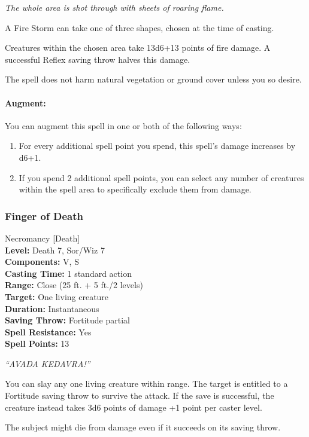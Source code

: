 \emph{The whole area is shot through with sheets of roaring flame.} 

A Fire Storm can take one of three shapes, chosen at the time of casting.

Creatures within the chosen area take 13d6+13 points of fire damage. A successful Reflex saving throw halves this damage.

The spell does not harm natural vegetation or ground cover unless you so desire.

\paragraph{Augment:} You can augment this spell in one or both of the following ways:
\begin{enumerate}
 \item For every additional spell point you spend, this spell's damage increases by d6+1.
 \item If you spend 2 additional spell points, you can select any number of creatures within the spell area to specifically exclude them from damage.
\end{enumerate}
\subsubsection{Finger of Death}
\label{Spell:FingerOfDeath}
Necromancy [Death]
\\ \textbf{Level:} Death 7, Sor/Wiz 7
\\ \textbf{Components:} V, S
\\ \textbf{Casting Time:} 1 standard action
\\ \textbf{Range:} Close (25 ft. + 5 ft./2 levels)
\\ \textbf{Target:} One living creature
\\ \textbf{Duration:} Instantaneous
\\ \textbf{Saving Throw:} Fortitude partial
\\ \textbf{Spell Resistance:} Yes
\\ \textbf{Spell Points:} 13

\emph{``AVADA KEDAVRA!''}

You can slay any one living creature within range. 
The target is entitled to a Fortitude saving throw to survive the attack. 
If the save is successful, the creature instead takes 3d6 points of damage +1 point per caster level.

The subject might die from damage even if it succeeds on its saving throw. 

